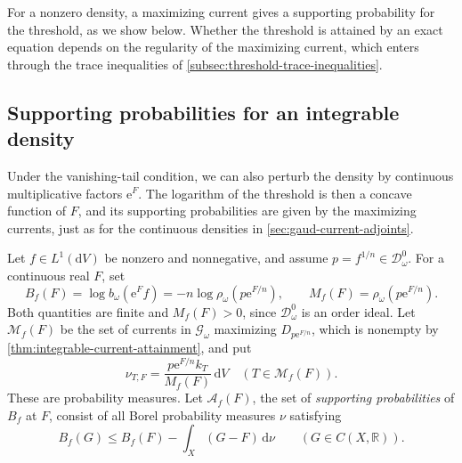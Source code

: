 For a nonzero density, a maximizing current gives a supporting probability for the threshold, as we show below. Whether the threshold is attained by an exact equation depends on the regularity of the maximizing current, which enters through the trace inequalities of \cref{subsec:threshold-trace-inequalities}.



\subsection{Supporting probabilities for an integrable density}

Under the vanishing-tail condition, we can also perturb the density by continuous multiplicative factors $\mathrm{e}^F$. The logarithm of the threshold is then a concave function of $F$, and its supporting probabilities are given by the maximizing currents, just as for the continuous densities in \cref{sec:gaud-current-adjoints}.

Let $f\in L^1(\mathrm{d}V)$ be nonzero and nonnegative, and assume $p=f^{1/n}\in\mathcal D_\omega^0$. For a continuous real $F$, set
\[
 B_f(F)=\log b_\omega(\mathrm{e}^Ff)
       =-n\log\rho_\omega(p \mathrm{e}^{F/n}),\qquad
 M_f(F)=\rho_\omega(p \mathrm{e}^{F/n}).
\]
Both quantities are finite and $M_f(F)>0$, since $\mathcal D_\omega^0$ is an order ideal. Let $\mathscr M_f(F)$ be the set of currents in $\mathscr G_\omega$ maximizing $D_{p \mathrm{e}^{F/n}}$, which is nonempty by \cref{thm:integrable-current-attainment}, and put
\[
 \nu_{T,F}=\frac{p \mathrm{e}^{F/n} k_T}{M_f(F)}\,\mathrm{d}V
 \quad(T\in\mathscr M_f(F)).
\]
These are probability measures. Let $\mathcal A_f(F)$, the set of \emph{supporting probabilities} of $B_f$ at $F$, consist of all Borel probability measures $\nu$ satisfying
\begin{equation}\label{eq:integrable-threshold-support}
 B_f(G)\leq B_f(F)-\int_X(G-F)\,\mathrm{d}\nu
 \qquad(G\in C(X,\mathbb R)).
\end{equation}

